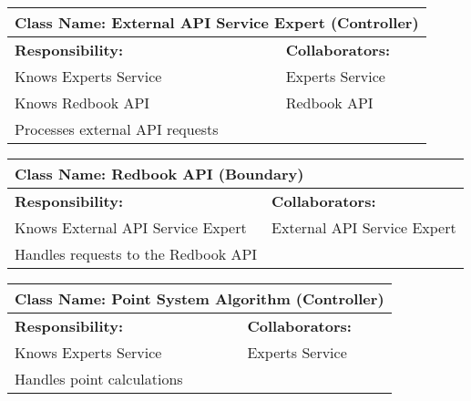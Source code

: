 \documentclass[]{article}
\begin{document}
\begin{itemize}
    \begin{table}[H]
        \centering
        \begin{tabular}{|p{5cm}|p{5cm}|}
        \hline 
         \multicolumn{2}{|l|}{\textbf{Class Name: External API Service Expert (Controller)}} \\
        \hline
        \textbf{Responsibility:} & \textbf{Collaborators:} \\
        \hline
        Knows Experts Service & Experts Service \\
        Knows Redbook API & Redbook API \\
        Processes external API requests & \\
        \hline
        \end{tabular}
    \end{table}
    
    \begin{table}[H]
        \centering
        \begin{tabular}{|p{5cm}|p{5cm}|}
        \hline 
         \multicolumn{2}{|l|}{\textbf{Class Name: Redbook API (Boundary)}} \\
        \hline
        \textbf{Responsibility:} & \textbf{Collaborators:} \\
        \hline
        Knows External API Service Expert & External API Service Expert \\
        Handles requests to the Redbook API & \\
        \hline
        \end{tabular}
    \end{table}
    
    \begin{table}[H]
        \centering
        \begin{tabular}{|p{5cm}|p{5cm}|}
        \hline 
         \multicolumn{2}{|l|}{\textbf{Class Name: Point System Algorithm (Controller)}} \\
        \hline
        \textbf{Responsibility:} & \textbf{Collaborators:} \\
        \hline
        Knows Experts Service & Experts Service \\
        Handles point calculations & \\
        \hline
        \end{tabular}
    \end{table}
    

\end{itemize}
\end{document}
